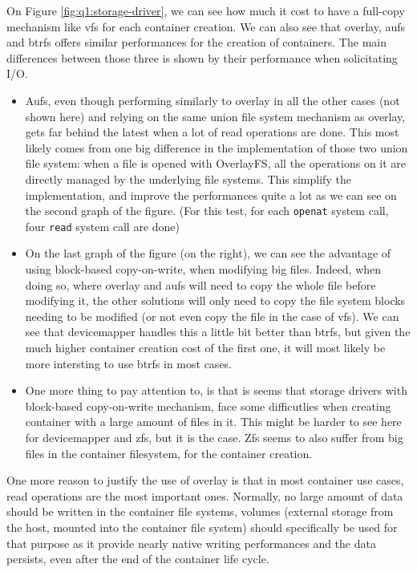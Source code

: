 On Figure \ref{fig:q1:storage-driver}, we can see how much it cost to have a full-copy mechanism like vfs for each container creation.  We can also see that overlay, aufs and btrfs offers similar performances for the creation of containers.  The main differences between those three is shown by their performance when solicitating I/O.  
\begin{itemize}
  \item Aufs, even though performing similarly to overlay in all the other cases (not shown here) and relying on the same union file system mechanism as overlay, gets far behind the latest when a lot of read operations are done.  This most likely comes from one big difference in the implementation of those two union file system: when a file is opened with OverlayFS, all the operations on it are directly managed by the underlying file systems.  This simplify the implementation, and improve the performances quite a lot as we can see on the second graph of the figure.  (For this test, for each \texttt{openat} system call, four \texttt{read} system call are done)
  \item On the last graph of the figure (on the right), we can see the advantage of using block-based copy-on-write, when modifying big files.  Indeed, when doing so, where overlay and aufs will need to copy the whole file before modifying it, the other solutions will only need to copy the file system blocks needing to be modified (or not even copy the file in the case of vfs).  We can see that devicemapper handles this a little bit better than btrfs, but given the much higher container creation cost of the first one, it will most likely be more intersting to use btrfs in most cases.
  \item One more thing to pay attention to, is that is seems that storage drivers with block-based copy-on-write mechanism, face some difficutlies when creating container with a large amount of files in it.  This might be harder to see here for devicemapper and zfs, but it is the case.  Zfs seems to also suffer from big files in the container filesystem, for the container creation.
\end{itemize}
One more reason to justify the use of overlay is that in most container use cases, read operations are the most important ones.  Normally, no large amount of data should be written in the container file systems, volumes (external storage from the host, mounted into the container file system) should specifically be used for that purpose as it provide nearly native writing performances and the data persists, even after the end of the container life cycle.

